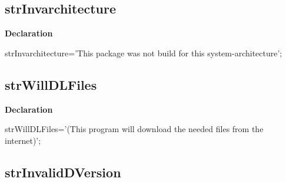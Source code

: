 \documentclass{report}
\newif\ifpdf
\begin{document}
\subsection*{strInvarchitecture}
\fi
\label{trstrings-strInvarchitecture}
\begin{list}{}{
\setlength{\itemindent}{0cm}
\setlength{\listparindent}{0cm}
\setlength{\leftmargin}{\evensidemargin}
\addtolength{\leftmargin}{\tmplength}
\settowidth{\labelsep}{X}
\addtolength{\leftmargin}{\labelsep}
\setlength{\labelwidth}{\tmplength}
}
\item[\textbf{Declaration}\hfill]
\ifpdf
\begin{flushleft}
\fi
\begin{ttfamily}
strInvarchitecture='This package was not build for this system-architecture';\end{ttfamily}

\ifpdf
\end{flushleft}
\fi

\end{list}
\ifpdf
\subsection*{\large{\textbf{strWillDLFiles}}\normalsize\hspace{1ex}\hrulefill}
\else
\subsection*{strWillDLFiles}
\fi
\label{trstrings-strWillDLFiles}
\begin{list}{}{
\setlength{\itemindent}{0cm}
\setlength{\listparindent}{0cm}
\setlength{\leftmargin}{\evensidemargin}
\addtolength{\leftmargin}{\tmplength}
\settowidth{\labelsep}{X}
\addtolength{\leftmargin}{\labelsep}
\setlength{\labelwidth}{\tmplength}
}
\item[\textbf{Declaration}\hfill]
\ifpdf
\begin{flushleft}
\fi
\begin{ttfamily}
strWillDLFiles='(This program will download the needed files from the internet)';\end{ttfamily}

\ifpdf
\end{flushleft}
\fi

\end{list}
\ifpdf
\subsection*{\large{\textbf{strInvalidDVersion}}\normalsize\hspace{1ex}\hrulefill}
\else
\end{document}
